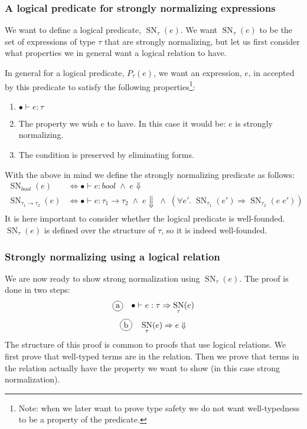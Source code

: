 \documentclass[a4paper,10pt,fleqn]{article}
\DeclareMathOperator{\SNPred}{SN}
\newcommand{\mtenv}{\ensuremath{\bullet}}
\newcommand{\tarrow}[2]{\ensuremath{ #1 \rightarrow #2}}
\newcommand{\SN}[2]{\ensuremath{\SNPred_{#1}(#2)}}
\newcommand*{\circled}[1]{\tikz[baseline=(char.base)]{
            \node[shape=circle,draw,inner sep=2pt] (char) {#1};}}
\begin{document}
\subsubsection*{A logical predicate for strongly normalizing expressions}
We want to define a logical predicate, \SN{\tau}{e}. We want \SN{\tau}{e} to be the set of expressions of type $\tau$ that are strongly normalizing, but let us first consider what properties we in general want a logical relation to have.

In general for a logical predicate, $P_\tau(e)$, we want an expression, $e$, in accepted by this predicate to satisfy the following properties\footnote{Note: when we later want to prove type safety we do not want well-typedness to be a property of the predicate.}:
\begin{enumerate}
\item $\mtenv \vdash e : \tau$
\item The property we wish $e$ to have. In this case it would be: $e$ is strongly normalizing.
\item The condition is preserved by eliminating forms.
\end{enumerate}
With the above in mind we define the strongly normalizing predicate as follows:
\begin{align*}
  \SN{bool}{e} & \Leftrightarrow \mtenv \vdash e : bool \; \wedge \; e \Downarrow \\
  \SN{\tarrow{\tau_1}{\tau_2}}{e} & \Leftrightarrow \mtenv \vdash e : \tarrow{\tau_1}{\tau_2} \; \wedge \; e \Downarrow \; \wedge \; (\forall e'. \; \SN{\tau_1}{e'} \Rightarrow \SN{\tau_2}{e \; e'})\\
\end{align*}
It is here important to consider whether the logical predicate is well-founded. \SN{\tau}{e} is defined over the structure of $\tau$, so it is indeed well-founded.
\subsubsection*{Strongly normalizing using a logical relation}
We are now ready to show strong normalization using \SN{\tau}{e}. The proof is done in two steps:
\[
\circled{a} \quad \mtenv \vdash e : \tau \Rightarrow \SN{\tau}{e}
\]
\[
\circled{b} \quad \SN{\tau}{e} \Rightarrow e \Downarrow
\]
The structure of this proof is common to proofs that use logical relations. We first prove that well-typed terms are in the relation. Then we prove that terms in the relation actually have the property we want to show (in this case strong normalization).
\end{document}
